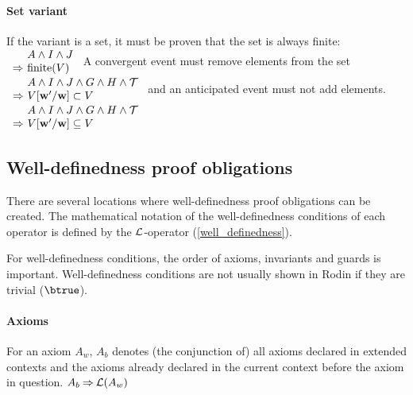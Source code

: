 \paragraph{Set variant}
\label{set_variant}
  If the variant is a set, it must be proven that the set is always finite:
%
  {$\begin{array}{r@{\ }l}
      & A \land I \land J \\
      \limp & \bfinite(V)
    \end{array}$}
A convergent event must remove elements from the set
%
  {$\begin{array}{r@{\ }l}
      & A \land I \land J \land G \land H \land \concbeforeafter \\
      \limp & V[\varlist{w}'/\varlist{w}]\subset V
    \end{array}$}
and an anticipated event must not add elements.
%
  {$\begin{array}{r@{\ }l}
      & A \land I \land J \land G \land H \land \concbeforeafter \\
      \limp & V[\varlist{w}'/\varlist{w}]\subseteq V
    \end{array}$}

\subsection{Well-definedness proof obligations}
\label{well_definedness_proof_obligations}
There are several locations where well-definedness proof obligations can be created.
The mathematical notation of the well-definedness conditions
of each operator is defined by the $\mathcal{L}$-operator (\ref{well_definedness}).

For well-definedness conditions, the order of axioms, invariants and guards is important.
Well-definedness conditions are not usually shown in Rodin if they are trivial ($\btrue$).

\paragraph{Axioms}
\label{well_definedness_of_axioms}
For an axiom $A_w$, $A_b$ denotes (the conjunction of) all axioms declared
  in extended contexts and the axioms already declared in
  the current context before the axiom in question.
%
  {$A_b \mathbin\Rightarrow \mathcal{L}(A_w)$}

